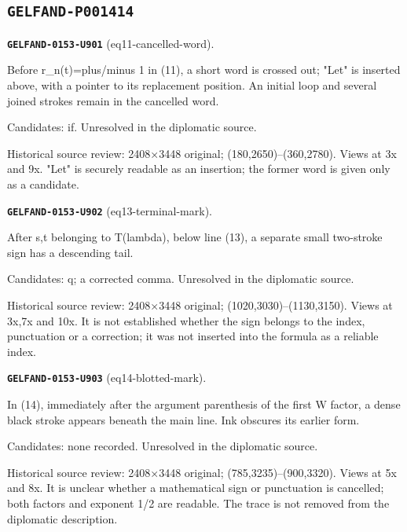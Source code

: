 \subsection*{\texttt{GELFAND-P001414}}
\par\noindent\leavevmode{}\label{GELFAND-0153-U901}\textbf{\texttt{GELFAND-0153-U901}} (eq11-cancelled-word).\nopagebreak[4]\par
Before r\_n(t)=plus/minus 1 in (11), a short word is crossed out; "Let" is inserted above, with a pointer to its replacement position. An initial loop and several joined strokes remain in the cancelled word.\par
Candidates: if. Unresolved in the diplomatic source.\par
Historical source review: 2408×3448 original; (180,2650)–(360,2780). Views at 3x and 9x. "Let" is securely readable as an insertion; the former word is given only as a candidate.\par\medskip
\par\noindent\leavevmode{}\label{GELFAND-0153-U902}\textbf{\texttt{GELFAND-0153-U902}} (eq13-terminal-mark).\nopagebreak[4]\par
After s,t belonging to T(lambda), below line (13), a separate small two-stroke sign has a descending tail.\par
Candidates: q; a corrected comma. Unresolved in the diplomatic source.\par
Historical source review: 2408×3448 original; (1020,3030)–(1130,3150). Views at 3x,7x and 10x. It is not established whether the sign belongs to the index, punctuation or a correction; it was not inserted into the formula as a reliable index.\par\medskip
\par\noindent\leavevmode{}\label{GELFAND-0153-U903}\textbf{\texttt{GELFAND-0153-U903}} (eq14-blotted-mark).\nopagebreak[4]\par
In (14), immediately after the argument parenthesis of the first W factor, a dense black stroke appears beneath the main line. Ink obscures its earlier form.\par
Candidates: none recorded. Unresolved in the diplomatic source.\par
Historical source review: 2408×3448 original; (785,3235)–(900,3320). Views at 5x and 8x. It is unclear whether a mathematical sign or punctuation is cancelled; both factors and exponent 1/2 are readable. The trace is not removed from the diplomatic description.\par\medskip
